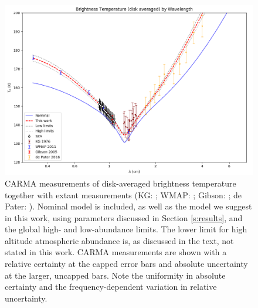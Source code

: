 \documentclass{article}
\begin{document}
	\begin{figure}
		\centering
		\includegraphics[width=\textwidth]{final_models_wl.png}
		\caption{\label{fig:emission_wl}CARMA measurements of disk-averaged brightness temperature together with extant measurements (KG: \citealt{1978Icar...35...44K}; WMAP: \citealt{2011ApJS..192...19W}; Gibson: \citealt{2005Icar..173..439G}; de Pater: \citealt{2016AGUFM.P31D..08D}). Nominal model is included, as well as the model we suggest in this work, using parameters discussed in Section \ref{s:results}, and the global high- and low-abundance limits. The lower limit for high altitude atmospheric abundance is, as discussed in the text, not stated in this work. CARMA measurements are shown with a relative certainty at the capped error bars and absolute uncertainty at the larger, uncapped bars. Note the uniformity in absolute certainty and the frequency-dependent variation in relative uncertainty.}
	\end{figure}
\end{document}

